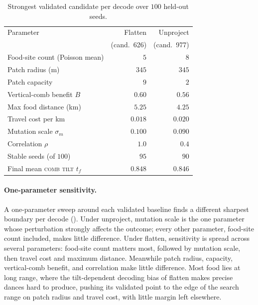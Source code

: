 \documentclass[11pt]{article}
\newcommand{\trait}[1]{\textsc{#1}}
\begin{document}
\begin{table}
  \centering
  \begin{tabular}{lrr}
    \toprule
    Parameter & Flatten & Unproject \\
              & (cand.\ 626) & (cand.\ 977) \\
    \midrule
    Food-site count (Poisson mean) & $5$    & $8$ \\
    Patch radius (m)               & $345$  & $345$ \\
    Patch capacity                 & $9$    & $2$ \\
    Vertical-comb benefit $B$      & $0.60$ & $0.56$ \\
    Max food distance (km)         & $5.25$ & $4.25$ \\
    Travel cost per km             & $0.018$ & $0.020$ \\
    Mutation scale $\sigma_m$      & $0.100$ & $0.090$ \\
    Correlation $\rho$             & $1.0$   & $0.4$ \\
    \addlinespace
    Stable seeds (of $100$)        & $95$    & $90$ \\
    Final mean \trait{comb tilt} $t_f$ & $0.848$ & $0.846$ \\
    \bottomrule
  \end{tabular}
  \caption{Strongest validated candidate per decode over $100$ held-out seeds.}
  \label{tab:validation}
\end{table}

\paragraph{One-parameter sensitivity.}
A one-parameter sweep around each validated baseline finds a different sharpest
boundary per decode ().
Under unproject, mutation scale is the one parameter whose perturbation strongly
affects the outcome; every other parameter, food-site count included, makes
little difference. Under flatten, sensitivity is spread across several
parameters: food-site count matters most, followed by mutation scale, then
travel cost and maximum distance. Meanwhile patch radius, capacity,
vertical-comb benefit, and correlation make little difference. Most food lies at
long range, where the tilt-dependent decoding bias of flatten makes precise
dances hard to produce, pushing its validated point to the edge of the search range on
patch radius and travel cost, with little margin left elsewhere.
\end{document}
